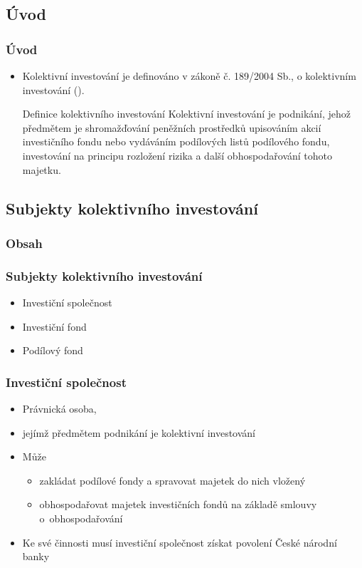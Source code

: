 \documentclass{beamer}
\begin{document}
\begin{frame}
\section*{Úvod}
  \frametitle{Úvod}
  \begin{itemize} 
    \item Kolektivní investování je definováno v zákoně č. 189/2004 Sb., o kolektivním investování (\cite{zakon}).
\begin{block}{Definice kolektivního investování}
Kolektivní investování je podnikání, jehož předmětem je
shromažďování peněžních prostředků upisováním akcií investičního fondu nebo vydáváním
podílových listů podílového fondu, investování na principu rozložení rizika a další
obhospodařování tohoto majetku.
  \end{block}
  \end{itemize} 

\end{frame}


\begin{frame}

\section{Subjekty kolektivního investování}
\frametitle{Obsah}
\tableofcontents[currentsection]

\end{frame}


\begin{frame}
\frametitle{Subjekty kolektivního investování} 
\begin{itemize}
  \item Investiční společnost
  \item Investiční fond
  \item Podílový fond
\end{itemize}
\end{frame}

\begin{frame}
\frametitle{Investiční společnost}
\begin{itemize} 
  \item Právnická osoba,
  \item jejímž předmětem podnikání je kolektivní investování
  \item Může
    \begin{itemize} 
      \item zakládat podílové fondy a spravovat majetek do nich vložený
      \item obhospodařovat majetek investičních fondů na základě smlouvy o~obhospodařování
    \end{itemize}
  \item Ke své činnosti musí investiční společnost získat povolení České národní banky
\end{itemize} 
\end{frame}
\end{document}
